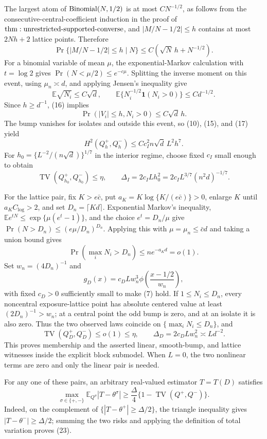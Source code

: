 The largest atom of \({\rm Binomial}(N,1/2)\) is at most \(CN^{-1/2}\), as follows from the consecutive-central-coefficient induction in the proof of \({\rm thm:unrestricted\text{-}supported\text{-}converse}\), and \(|M/N-1/2|\leq h\) contains at most \(2Nh+2\) lattice points.  Therefore
\[
 \Pr\{|M/N-1/2|\leq h\mid N\}
 \leq C(\sqrt N\,h+N^{-1/2}).
\tag{16}
\]
For a binomial variable of mean \(\mu\), the exponential-Markov calculation with \(t=\log2\) gives \(\Pr(N<\mu/2)\leq e^{-c\mu}\).  Splitting the inverse moment on this event, using \(\mu_n\asymp d\), and applying Jensen's inequality give
\[
 \mathbb E\sqrt{N_i}\leq C\sqrt d,
 \qquad
 \mathbb E\{N_i^{-1/2}\mathbf1(N_i>0)\}\leq Cd^{-1/2}.
\]
Since \(h\geq d^{-1}\), (16) implies
\[
 \Pr(|V_i|\leq h,N_i>0)\leq C\sqrt d\,h.
\tag{17}
\]
The bump vanishes for isolates and outside this event, so (10), (15), and (17) yield
\[
 H^2(Q_h^+,Q_h^-)
 \leq Cc_I^2n\sqrt d\,L^2h^7.
\tag{18}
\]
For \(h_0=\{L^{-2}/(n\sqrt d)\}^{1/7}\) in the interior regime, choose fixed \(c_I\) small enough to obtain
\[
 \operatorname{TV}(Q_{h_0}^+,Q_{h_0}^-)\leq\eta,
 \qquad
 \Delta_I=2c_ILh_0^2
 =2c_IL^{3/7}(n^2d)^{-1/7}.
\tag{19}
\]

For the lattice pair, fix \(K>e\bar c\), put \(a_K=K\log\{K/(e\bar c)\}>0\), enlarge \(K\) until \(a_KC_{\log}>2\), and set \(D_n=\lceil Kd\rceil\).  Exponential Markov's inequality, \(\mathbb Ee^{tN}\leq\exp\{\mu(e^t-1)\}\), and the choice \(e^t=D_n/\mu\) give \(\Pr(N>D_n)\leq(e\mu/D_n)^{D_n}\).  Applying this with \(\mu=\mu_n\leq\bar c d\) and taking a union bound gives
\[
 \Pr(\max_iN_i>D_n)\leq ne^{-a_Kd}=o(1).
\tag{20}
\]
Set \(w_n=(4D_n)^{-1}\) and
\[
 g_D(x)=c_DLw_n^3\phi\!\left(\frac{x-1/2}{w_n}\right),
\tag{21}
\]
with fixed \(c_D>0\) sufficiently small to make (7) hold.  If \(1\leq N_i\leq D_n\), every noncentral exposure-lattice point has absolute centered value at least \((2D_n)^{-1}>w_n\); at a central point the odd bump is zero, and at an isolate it is also zero.  Thus the two observed laws coincide on \(\{\max_iN_i\leq D_n\}\), and
\[
 \operatorname{TV}(Q_D^+,Q_D^-)
 \leq o(1)\leq\eta,
 \qquad \Delta_D=2c_DLw_n^2\asymp Ld^{-2}.
\tag{22}
\]
This proves membership and the asserted linear, smooth-bump, and lattice witnesses inside the explicit block submodel.  When \(L=0\), the two nonlinear terms are zero and only the linear pair is needed.

For any one of these pairs, an arbitrary real-valued estimator \(T=T(D)\) satisfies
\[
 \max_{\sigma\in\{+,-\}}\mathbb E_{Q^\sigma}|T-\theta^\sigma|
 \geq\frac\Delta4\{1-\operatorname{TV}(Q^+,Q^-)\}.
\tag{23}
\]
Indeed, on the complement of \(\{|T-\theta^+|\geq\Delta/2\}\), the triangle inequality gives \(|T-\theta^-|\geq\Delta/2\); summing the two risks and applying the definition of total variation proves (23).


